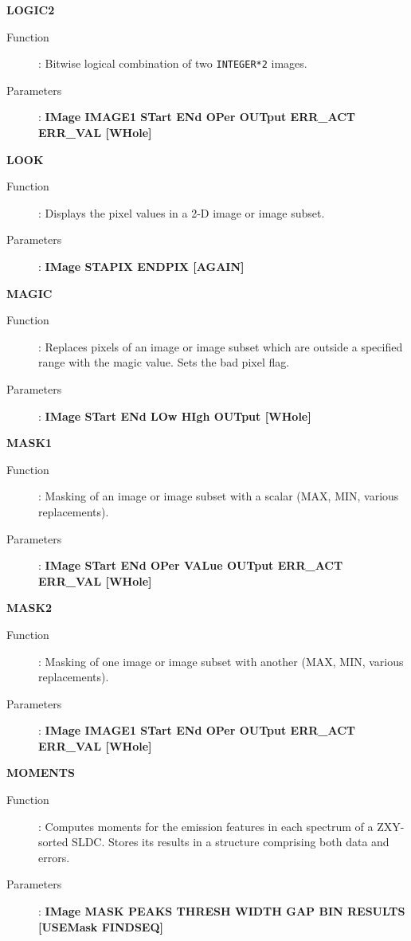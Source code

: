 {\large\bf LOGIC2 \hfill}
\begin{description}
\item[Function]: 
Bitwise logical combination of two {\tt INTEGER*2} images.
\item[Parameters]: 
{\bf IMage IMAGE1 STart ENd OPer OUTput ERR\_ACT ERR\_VAL [WHole]}
\end{description}
\vspace{5mm}

{\large\bf LOOK \hfill}
\begin{description}
\item[Function]: 
Displays the pixel values in a 2-D image or image subset.
\item[Parameters]: 
{\bf IMage STAPIX ENDPIX [AGAIN]}
\end{description}
\vspace{5mm}

{\large\bf MAGIC \hfill}
\begin{description}
\item[Function]: 
Replaces pixels of an image or image subset which are outside a specified range
with the magic value. Sets the bad pixel flag.            
\item[Parameters]: 
{\bf IMage STart ENd LOw HIgh OUTput [WHole]}
\end{description}
\vspace{5mm}

{\large\bf MASK1 \hfill}
\begin{description}
\item[Function]: 
Masking of an image or image subset with a scalar (MAX, MIN, various 
replacements).
\item[Parameters]: 
{\bf IMage STart ENd OPer VALue OUTput ERR\_ACT ERR\_VAL [WHole]}
\end{description}

{\large\bf MASK2 \hfill}
\begin{description}
\item[Function]: 
Masking of one image or image subset with another (MAX, MIN, various 
replacements).
\item[Parameters]: 
{\bf IMage IMAGE1 STart ENd OPer OUTput ERR\_ACT ERR\_VAL [WHole]}
\end{description}
\vspace{5mm}

{\large\bf MOMENTS \hfill}
\begin{description}
\item[Function]:
Computes moments for the emission features in each spectrum of a ZXY-sorted 
SLDC. Stores its results in a structure comprising both data and errors.
\item[Parameters]:
{\bf IMage MASK PEAKS THRESH WIDTH GAP BIN RESULTS [USEMask FINDSEQ]}
\end{description}
\vspace{5mm}

